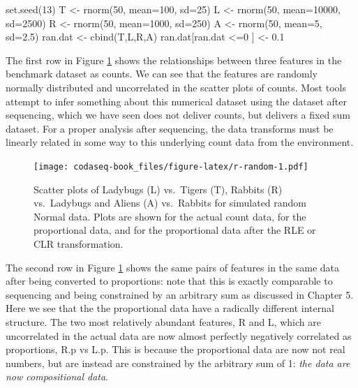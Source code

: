 \documentclass[
  onecolumn]{article}
\newenvironment{Shaded}{\begin{snugshade}}{\end{snugshade}}
\newcommand{\AttributeTok}[1]{\textcolor[rgb]{0.77,0.63,0.00}{#1}}
\newcommand{\DecValTok}[1]{\textcolor[rgb]{0.00,0.00,0.81}{#1}}
\newcommand{\FloatTok}[1]{\textcolor[rgb]{0.00,0.00,0.81}{#1}}
\newcommand{\FunctionTok}[1]{\textcolor[rgb]{0.00,0.00,0.00}{#1}}
\newcommand{\NormalTok}[1]{#1}
\newcommand{\OtherTok}[1]{\textcolor[rgb]{0.56,0.35,0.01}{#1}}
\newcommand{\SpecialCharTok}[1]{\textcolor[rgb]{0.00,0.00,0.00}{#1}}
\begin{document}
\begin{Shaded}
\begin{Highlighting}[]
\FunctionTok{set.seed}\NormalTok{(}\DecValTok{13}\NormalTok{)}
\NormalTok{T }\OtherTok{\textless{}{-}} \FunctionTok{rnorm}\NormalTok{(}\DecValTok{50}\NormalTok{, }\AttributeTok{mean=}\DecValTok{100}\NormalTok{, }\AttributeTok{sd=}\DecValTok{25}\NormalTok{)}
\NormalTok{L }\OtherTok{\textless{}{-}} \FunctionTok{rnorm}\NormalTok{(}\DecValTok{50}\NormalTok{, }\AttributeTok{mean=}\DecValTok{10000}\NormalTok{, }\AttributeTok{sd=}\DecValTok{2500}\NormalTok{)}
\NormalTok{R }\OtherTok{\textless{}{-}} \FunctionTok{rnorm}\NormalTok{(}\DecValTok{50}\NormalTok{, }\AttributeTok{mean=}\DecValTok{1000}\NormalTok{, }\AttributeTok{sd=}\DecValTok{250}\NormalTok{)}
\NormalTok{A }\OtherTok{\textless{}{-}} \FunctionTok{rnorm}\NormalTok{(}\DecValTok{50}\NormalTok{, }\AttributeTok{mean=}\DecValTok{5}\NormalTok{, }\AttributeTok{sd=}\FloatTok{2.5}\NormalTok{)}
\NormalTok{ran.dat }\OtherTok{\textless{}{-}} \FunctionTok{cbind}\NormalTok{(T,L,R,A)}
\NormalTok{ran.dat[ran.dat }\SpecialCharTok{\textless{}=}\DecValTok{0}\NormalTok{ ] }\OtherTok{\textless{}{-}} \FloatTok{0.1}
\end{Highlighting}
\end{Shaded}

The first row in Figure \ref{fig:r-random} shows the relationships between three features in the benchmark dataset as counts. We can see that the features are randomly normally distributed and uncorrelated in the scatter plots of counts. Most tools attempt to infer something about this numerical dataset using the dataset after sequencing, which we have seen does not deliver counts, but delivers a fixed sum dataset. For a proper analysis after sequencing, the data transforms must be linearly related in some way to this underlying count data from the environment.

\begin{figure}
\centering
\texttt{[image: codaseq-book\_files/figure-latex/r-random-1.pdf]}
\caption{\label{fig:r-random}Scatter plots of Ladybugs (L) vs.~Tigers (T), Rabbits (R) vs.~Ladybugs and Aliens (A) vs.~Rabbits for simulated random Normal data. Plots are shown for the actual count data, for the proportional data, and for the proportional data after the RLE or CLR transformation.}
\end{figure}

The second row in Figure \ref{fig:r-random} shows the same pairs of features in the same data after being converted to proportions: note that this is exactly comparable to sequencing and being constrained by an arbitrary sum as discussed in Chapter 5. Here we see that the the proportional data have a radically different internal structure. The two most relatively abundant features, R and L, which are uncorrelated in the actual data are now almost perfectly negatively correlated as proportions, R.p vs L.p. This is because the proportional data are now not real numbers, but are instead are constrained by the arbitrary sum of 1: \emph{the data are now compositional data}.
\end{document}

